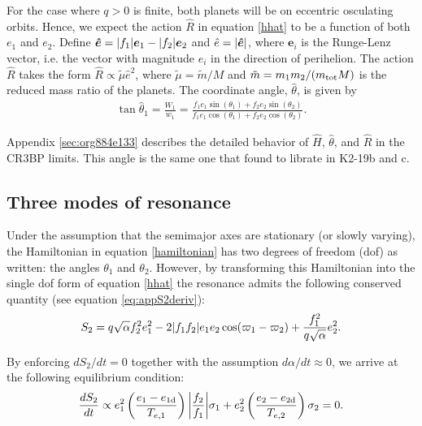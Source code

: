 \documentclass[usenatbib,twocolumn]{mnras}
\renewcommand{\v}[1]{\boldsymbol{ #1 }}
\DeclarePairedDelimiter{\abs}{|}{|}
\begin{document}
For the case where \(q>0\) is finite, both planets will be on eccentric
osculating orbits.  Hence, we expect the action \(\hat R\) in equation
\eqref{hhat} to be a function of both \(e_1\) and \(e_2\).  Define \(\v{\hat
e} = \abs{f_1}\v e_1 - \abs{f_2}\v e_2\) and \(\hat e = \abs{\v{\hat
e}}\), where \(\v e_i\) is the Runge-Lenz vector, i.e. the vector with
magnitude \(e_i\) in the direction of perihelion.  The action \(\hat R\)
takes the form \(\hat R \propto \tilde \mu \hat e^2\), where
\(\tilde\mu=\tilde m/M\) and \(\tilde m= m_1m_2/(m_{\rm tot}M)\) is the
reduced mass ratio of the planets.  The coordinate angle, \(\hat\theta\),
is given by
\begin{align}
\label{hattheta}
  \tan\hat{\theta}_1 = \frac{W_1}{w_1} = \frac{f_1 e_1\sin(\theta_1)
  + f_2e_2\sin(\theta_2)}{f_1e_1\cos(\theta_1) + f_2e_2\cos(\theta_2)}.
\end{align}

\noindent
Appendix \ref{sec:org884e133}
describes the detailed behavior of \(\hat H\), \(\hat \theta\),
and \(\hat R\) in the CR3BP limits.
This angle is the same one that \citet{petit_resonance_2020}
found to librate in K2-19b and c.

\subsection{Three modes of resonance}
\label{sec:org5056da7}
Under the assumption that the semimajor axes are stationary (or slowly
varying), the Hamiltonian in equation \eqref{hamiltonian} has two
degrees of freedom (dof) as written: the angles \(\theta_1\) and
\(\theta_2\).  However, by transforming this Hamiltonian into the single
dof form of equation \eqref{hhat} the resonance admits the following
conserved quantity (see equation \eqref{eq:appS2deriv}):
\begin{align}
  \label{eq:s2}
  S_2 = q\sqrt{\alpha}f_2^2e_1^2
-2\abs{f_1f_2}e_1e_2\cos(\varpi_1-\varpi_2) + \frac{f_1^2}{q\sqrt\alpha}e_2^2.
\end{align}

\noindent
By enforcing \(dS_2/dt = 0\) together with the assumption \(d\alpha/dt
\approx 0\), we arrive at the following equilibrium condition:
\begin{align}
  \label{eq:S2eq}
  \frac{dS_2}{dt} \propto e_1^2\left(\frac{e_1-e_{1\rm d}}{T_{e,1}}\right)\abs*{\frac{f_2}{f_1}}
  \sigma_1
  + e_2^2\left(\frac{e_2-e_{2\rm d}}{T_{e,2}}\right)
  \sigma_2
  = 0.
\end{align}
\end{document}

